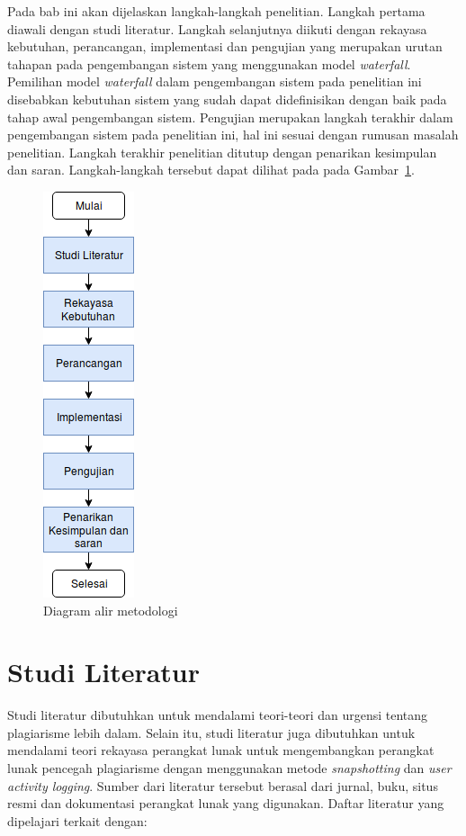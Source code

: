 

Pada bab ini akan dijelaskan langkah-langkah
penelitian. Langkah pertama diawali dengan studi literatur. Langkah selanjutnya
diikuti dengan rekayasa kebutuhan, perancangan, implementasi dan pengujian yang
merupakan urutan tahapan pada pengembangan sistem yang menggunakan model
\emph{waterfall}. Pemilihan model \emph{waterfall} dalam pengembangan sistem
pada penelitian ini disebabkan kebutuhan sistem yang sudah dapat didefinisikan
dengan baik pada tahap awal pengembangan sistem. Pengujian merupakan langkah
terakhir dalam pengembangan sistem pada penelitian ini, hal ini sesuai dengan
rumusan masalah penelitian. Langkah terakhir penelitian
ditutup dengan penarikan kesimpulan dan saran. Langkah-langkah tersebut dapat
dilihat pada pada Gambar~\ref{fig:diagram-alir}.

\begin{figure}[tph]
  \centering
  \includegraphics[width=.17\linewidth]{img/diagram-metodologi}
  \caption{Diagram alir metodologi}\label{fig:diagram-alir}
\end{figure}

\section{Studi Literatur}

Studi literatur dibutuhkan untuk mendalami teori-teori dan urgensi
tentang plagiarisme lebih dalam. Selain itu, studi literatur juga
dibutuhkan untuk mendalami teori rekayasa perangkat lunak untuk
mengembangkan perangkat lunak pencegah plagiarisme dengan menggunakan
metode \emph{snapshotting} dan \emph{user activity logging}. Sumber
dari literatur tersebut berasal dari jurnal, buku, situs resmi dan
dokumentasi perangkat lunak yang digunakan. Daftar literatur yang
dipelajari terkait dengan:

